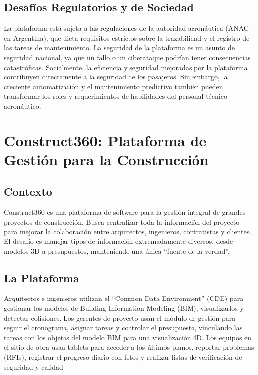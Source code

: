 \documentclass[12pt]{article}
\begin{document}
\subsection{Desafíos Regulatorios y de Sociedad}
La plataforma está sujeta a las regulaciones de la autoridad aeronáutica (ANAC en Argentina), que dicta requisitos estrictos sobre la trazabilidad y el registro de las tareas de mantenimiento. La seguridad de la plataforma es un asunto de seguridad nacional, ya que un fallo o un ciberataque podrían tener consecuencias catastróficas. Socialmente, la eficiencia y seguridad mejoradas por la plataforma contribuyen directamente a la seguridad de los pasajeros. Sin embargo, la creciente automatización y el mantenimiento predictivo también pueden transformar los roles y requerimientos de habilidades del personal técnico aeronáutico.

\newpage

\section{Construct360: Plataforma de Gestión para la Construcción}

\subsection{Contexto}
Construct360 es una plataforma de software para la gestión integral de grandes proyectos de construcción. Busca centralizar toda la información del proyecto para mejorar la colaboración entre arquitectos, ingenieros, contratistas y clientes. El desafío es manejar tipos de información extremadamente diversos, desde modelos 3D a presupuestos, manteniendo una única ``fuente de la verdad''.

\subsection{La Plataforma}
Arquitectos e ingenieros utilizan el ``Common Data Environment'' (CDE) para gestionar los modelos de Building Information Modeling (BIM), visualizarlos y detectar colisiones. Los gerentes de proyecto usan el módulo de gestión para seguir el cronograma, asignar tareas y controlar el presupuesto, vinculando las tareas con los objetos del modelo BIM para una visualización 4D. Los equipos en el sitio de obra usan tablets para acceder a los últimos planos, reportar problemas (RFIs), registrar el progreso diario con fotos y realizar listas de verificación de seguridad y calidad.
\end{document}
